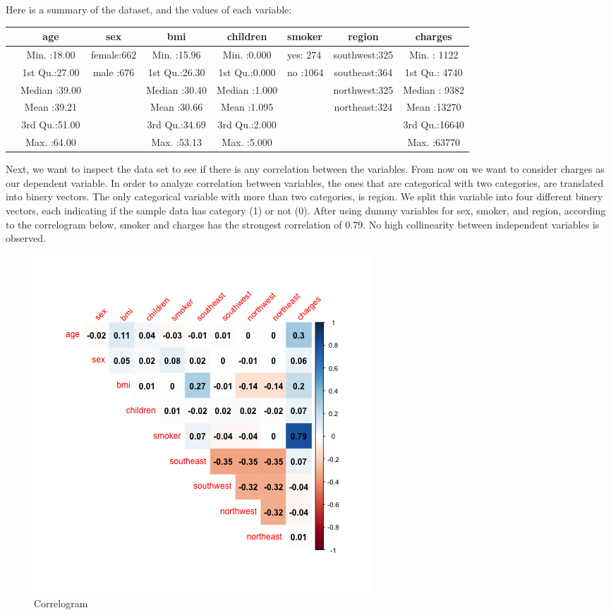 \documentclass[
]{article}
\begin{document}
Here is a summary of the dataset, and the values of each variable:

\begin{longtable}[]{@{}lcccclcc@{}}
\toprule
& age & sex & bmi & children & smoker & region & charges\tabularnewline
\midrule
\endhead
& Min. :18.00 & female:662 & Min. :15.96 & Min. :0.000 & yes: 274 &
southwest:325 & Min. : 1122\tabularnewline
& 1st Qu.:27.00 & male :676 & 1st Qu.:26.30 & 1st Qu.:0.000 & no :1064 &
southeast:364 & 1st Qu.: 4740\tabularnewline
& Median :39.00 & & Median :30.40 & Median :1.000 & & northwest:325 &
Median : 9382\tabularnewline
& Mean :39.21 & & Mean :30.66 & Mean :1.095 & & northeast:324 & Mean
:13270\tabularnewline
& 3rd Qu.:51.00 & & 3rd Qu.:34.69 & 3rd Qu.:2.000 & & & 3rd
Qu.:16640\tabularnewline
& Max. :64.00 & & Max. :53.13 & Max. :5.000 & & & Max.
:63770\tabularnewline
\bottomrule
\end{longtable}

Next, we want to inspect the data set to see if there is any correlation
between the variables. From now on we want to consider charges as our
dependent variable. In order to analyze correlation between variables,
the ones that are categorical with two categories, are translated into
binery vectors. The only categorical variable with more than two
categories, is region. We split this variable into four different binery
vectors, each indicating if the sample data has category (1) or not (0).
After using dummy variables for sex, smoker, and region, according to
the correlogram below, smoker and charges has the strongest correlation
of 0.79. No high collinearity between independent variables is observed.

\begin{figure}
\centering
\includegraphics{../images/corrplot.png}
\caption{Correlogram}
\end{figure}
\end{document}

